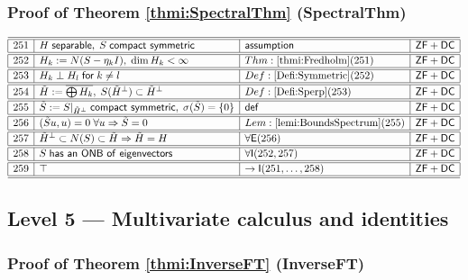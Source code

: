 \documentclass[11pt,reqno]{amsart}
\begin{document}
\medskip

\subsubsection*{Proof of Theorem \ref{thmi:SpectralThm} (\textsf{SpectralThm})}

\noindent$%
\begin{array}{|r|l|l|l|}
\hline\hline
251 & H\;\mathsf{separable},\;S\;\mathsf{compact\ symmetric} & \mathsf{assumption} & \mathsf{ZF+DC} \\ \hline\hline
252 & H_{k}:=N(S-\eta_{k}I),\;\dim H_{k}<\infty & Thm:\ref{thmi:Fredholm}(251) & \mathsf{ZF+DC} \\ \hline\hline
253 & H_{k}\perp H_{l}\;\mathsf{for}\;k\neq l & Def:\ref{Defi:Symmetric}(252) & \mathsf{ZF+DC} \\ \hline\hline
254 & \tilde{H}:=\overline{\bigoplus H_{k}},\;S(\tilde{H}^{\perp})\subset\tilde{H}^{\perp} & Def:\ref{Defi:Sperp}(253) & \mathsf{ZF+DC} \\ \hline\hline
255 & \tilde{S}:=S|_{\tilde{H}^{\perp}}\;\mathsf{compact\ symmetric},\;\sigma(\tilde{S})=\{0\} & \mathsf{def} & \mathsf{ZF+DC} \\ \hline\hline
256 & (\tilde{S}u,u)=0\;\forall u\Rightarrow\tilde{S}=0 & Lem:\ref{lemi:BoundsSpectrum}(255) & \mathsf{ZF+DC} \\ \hline\hline
257 & \tilde{H}^{\perp}\subset N(S)\subset\tilde{H}\Rightarrow\tilde{H}=H & \forall\mathsf{E}(256) & \mathsf{ZF+DC} \\ \hline\hline
258 & S\;\mathsf{has\ an\ ONB\ of\ eigenvectors} & \forall\mathsf{I}(252,257) & \mathsf{ZF+DC} \\ \hline\hline
259 & \top & \to\mathsf{I}(251,\dots,258) & \mathsf{ZF+DC} \\ \hline\hline
\end{array}%
$

\medskip

\subsection*{\textsf{Level 5 --- Multivariate calculus and identities}}

\subsubsection*{Proof of Theorem \ref{thmi:InverseFT} (\textsf{InverseFT})}
\end{document}
